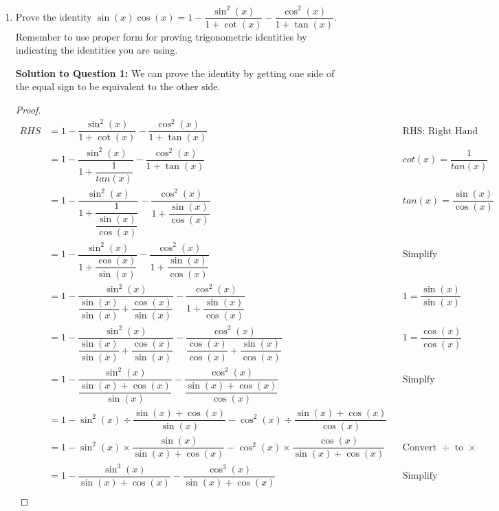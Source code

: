 \documentclass[12pt]{book}
\begin{document}
\begin{enumerate}

\item Prove the identity $\sin(x)\cos(x)=1-\dfrac{\sin^2(x)}{1+\cot(x)}-\dfrac{\cos^2(x)}{1+\tan(x)}$. Remember to use proper form for proving trigonometric identities by indicating the identities you are using.

\vspace{-0.4cm}
\textbf{Solution to Question 1:}
We can prove the identity by getting one side of the equal sign to be equivalent to the other side.
\vspace{-3cm}

\begin{proof}
\addtolength{\jot}{1em}
\begin{align*}
    RHS &= 1-\dfrac{\sin^2(x)}{1+\cot(x)}-\dfrac{\cos^2(x)}{1+\tan(x)} && \text{RHS: Right Hand Side} \\
    &= 1-\dfrac{\sin^2(x)}{1+\dfrac{1}{tan(x)}}-\dfrac{\cos^2(x)}{1+\tan(x)} && cot(x) = \dfrac{1}{tan(x)} \\
    &= 1-\dfrac{\sin^2(x)}{1+\dfrac{1}{\dfrac{\sin(x)}{\cos(x)}}}-\dfrac{\cos^2(x)}{1+\dfrac{\sin(x)}{\cos(x)}} && tan(x) = \dfrac{\sin(x)}{\cos(x)} \\
    &= 1-\dfrac{\sin^2(x)}{1+\dfrac{\cos(x)}{\sin(x)}}-\dfrac{\cos^2(x)}{1+\dfrac{\sin(x)}{\cos(x)}} && \text{Simplify} \\
    &= 1-\dfrac{\sin^2(x)}{\dfrac{\sin(x)}{\sin(x)} +\dfrac{\cos(x)}{\sin(x)}}-\dfrac{\cos^2(x)}{1+\dfrac{\sin(x)}{\cos(x)}} && 1 = \dfrac{\sin(x)}{\sin(x)} \\
    &= 1-\dfrac{\sin^2(x)}{\dfrac{\sin(x)}{\sin(x)} +\dfrac{\cos(x)}{\sin(x)}}-\dfrac{\cos^2(x)}{\dfrac{\cos(x)}{\cos(x)}+\dfrac{\sin(x)}{\cos(x)}} && 1 = \dfrac{\cos(x)}{\cos(x)} \\
    &= 1-\dfrac{\sin^2(x)}{\dfrac{\sin(x) + \cos(x)}{\sin(x)}}-\dfrac{\cos^2(x)}{\dfrac{\sin(x) + \cos(x)}{\cos(x)}} && \text{Simplfy} \\
    &= 1-\sin^2(x) \div \dfrac{\sin(x) + \cos(x)}{\sin(x)} - \cos^2(x) \div \dfrac{\sin(x) + \cos(x)}{\cos(x)} \\
    &= 1-\sin^2(x) \times \dfrac{\sin(x)}{\sin(x) + \cos(x)} - \cos^2(x) \times \dfrac{\cos(x)}{\sin(x) + \cos(x)} && \text{Convert } \div \text{ to } \times \\
    &= 1-\dfrac{\sin^3(x)}{\sin(x) + \cos(x)} - \dfrac{\cos^3(x)}{\sin(x) + \cos(x)} && \text{Simplify} \\
\end{align*}


\end{proof}
\end{enumerate}
\end{document}
